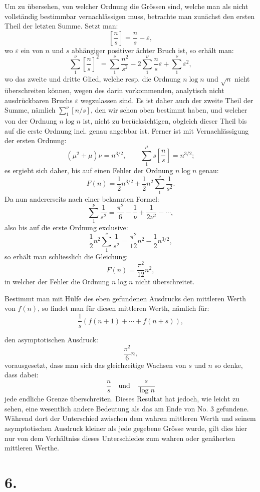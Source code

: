 \documentclass[11pt]{article}
\newcommand{\floor}[1]{\left[#1\right]}
\begin{document}
Um zu übersehen, von welcher Ordnung die Grössen sind, welche man als nicht vollständig bestimmbar vernachlässigen muss, betrachte man zunächst den ersten Theil der letzten Summe. Setzt man:
\[
 \floor{\frac ns}=\frac ns-\varepsilon,
\]
wo $\varepsilon$ ein von $n$ und $s$ abhängiger positiver ächter Bruch ist, so erhält man:
\[
 \sum_{1}^{\nu}\floor{\frac ns}^{2}=
 \sum_{1}^{\nu}\frac{n^2}{s^2}-2\sum_{1}^{\nu}\frac ns\varepsilon+
 \sum_{1}^{\nu}\varepsilon^2,
\]
wo das zweite und dritte Glied, welche resp. die Ordnung $n\log n$ und $\sqrt n$ nicht überschreiten können, wegen des darin vorkommenden, analytisch nicht ausdrückbaren Bruchs $\varepsilon$ wegzulassen sind. Es ist daher auch der zweite Theil der Summe, nämlich $\sum_1^{\nu}\floor{n/s}$, den wir schon oben bestimmt haben, und welcher von der Ordnung $n\log n$ ist, nicht zu berücksichtigen, obgleich dieser Theil bis auf die erste Ordnung incl. genau angebbar ist. Ferner ist mit Vernachlässigung der ersten Ordnung:
\[
 (\mu^2+\mu)\nu=n^{3/2},\qquad
 \sum_{1}^{\mu}s\floor{\frac ns}=n^{3/2};
\]
es ergiebt sich daher, bis auf einen Fehler der Ordnung $n\log n$ genau:
\[
 F(n)=\frac12 n^{3/2}+\frac12 n^2\sum_{1}^{\nu}\frac1{s^2}.
\]
Da nun andererseits nach einer bekannten Formel:
\[
 \sum_{1}^{\nu}\frac1{s^2}=\frac{\pi^2}{6}-\frac1\nu+\frac{1}{2\nu^2}-\cdots,
\]
also bis auf die erste Ordnung exclusive:
\[
 \frac12 n^2\sum_{1}^{\nu}\frac1{s^2}=\frac{\pi^2}{12}n^2-\frac12 n^{3/2},
\]
so erhält man schliesslich die Gleichung:
\[
 F(n)=\frac{\pi^2}{12}n^2,
\]
in welcher der Fehler die Ordnung $n\log n$ nicht überschreitet.

Bestimmt man mit Hülfe des eben gefundenen Ausdrucks den mittleren Werth von $f(n)$, so findet man für diesen mittleren Werth, nämlich für:
\[
 \frac1s\left(f(n+1)+\cdots+f(n+s)\right),
\]

den asymptotischen Ausdruck:
\[
 \frac{\pi^2}{6}n,
\]
vorausgesetzt, dass man sich das gleichzeitige Wachsen von $s$ und $n$ so denke, dass dabei:
\[
 \frac ns\quad \text{und}\quad \frac{s}{\log n}
\]
jede endliche Grenze überschreiten. Dieses Resultat hat jedoch, wie leicht zu sehen, eine wesentlich andere Bedeutung als das am Ende von No. 3 gefundene. Während dort der Unterschied zwischen dem wahren mittleren Werth und seinem asymptotischen Ausdruck kleiner als jede gegebene Grösse wurde, gilt dies hier nur von dem Verhältniss dieses Unterschiedes zum wahren oder genäherten mittleren Werthe.

\section*{6.}
\end{document}
